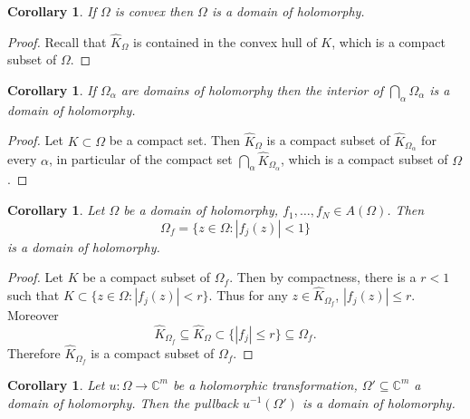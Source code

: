 \documentclass[12pt]{report}
\newcommand{\CC}{\mathbb{C}}
\newtheorem{corollary}[theorem]{Corollary}
\theoremstyle{definition}
\begin{document}
\begin{corollary}
    If $\Omega$ is convex then $\Omega$ is a domain of holomorphy.
\end{corollary}
\begin{proof}
    Recall that $\hat K_\Omega$ is contained in the convex hull of $K$, which is a compact subset of $\Omega$.
\end{proof}
\begin{corollary}
    If $\Omega_\alpha$ are domains of holomorphy then the interior of $\bigcap_\alpha \Omega_\alpha$ is a domain of holomorphy.
\end{corollary}
\begin{proof}
    Let $K \subset \Omega$ be a compact set. Then $\hat K_\Omega$ is a compact subset of $\hat K_{\Omega_\alpha}$ for every $\alpha$, in particular of the compact set $\bigcap_\alpha \hat K_{\Omega_\alpha}$, which is a compact subset of $\Omega$.
\end{proof}
\begin{corollary}
    Let $\Omega$ be a domain of holomorphy, $f_1, \dots, f_N \in A(\Omega)$. Then
    $$\Omega_f = \{z \in \Omega: |f_j(z)| < 1\}$$
    is a domain of holomorphy.
\end{corollary}
\begin{proof}
    Let $K$ be a compact subset of $\Omega_f$. Then by compactness, there is a $r < 1$ such that $K \subset \{z \in \Omega: |f_j(z)| < r\}$. Thus for any $z \in \hat K_{\Omega_f}$, $|f_j(z)| \leq r$. Moreover
    $$\hat K_{\Omega_f} \subseteq \hat K_\Omega \subset \{|f_j| \leq r\} \subseteq \Omega_f.$$
    Therefore $\hat K_{\Omega_f}$ is a compact subset of $\Omega_f$. 
\end{proof}
\begin{corollary}
    Let $u: \Omega \to \CC^m$ be a holomorphic transformation, $\Omega' \subseteq \CC^m$ a domain of holomorphy. Then the pullback $u^{-1}(\Omega')$ is a domain of holomorphy.
\end{corollary}
\end{document}
